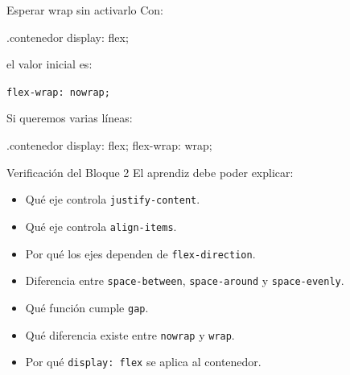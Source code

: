 \documentclass[aspectratio=169,11.5pt]{beamer}
\begin{document}
    \begin{frame}[fragile]{Esperar wrap sin activarlo}
        Con:

        \begin{csscodedark}
            .contenedor {
                display: flex;
            }
        \end{csscodedark}

        el valor inicial es:

        \begin{center}
            \texttt{flex-wrap: nowrap;}
        \end{center}

        Si queremos varias líneas:

        \begin{csscodedark}
            .contenedor {
                display: flex;
                flex-wrap: wrap;
            }
        \end{csscodedark}
    \end{frame}

    \begin{frame}{Verificación del Bloque 2}
        El aprendiz debe poder explicar:

        \begin{itemize}
            \item Qué eje controla \texttt{justify-content}.
            \item Qué eje controla \texttt{align-items}.
            \item Por qué los ejes dependen de \texttt{flex-direction}.
            \item Diferencia entre \texttt{space-between},
            \texttt{space-around} y \texttt{space-evenly}.
            \item Qué función cumple \texttt{gap}.
            \item Qué diferencia existe entre \texttt{nowrap}
            y \texttt{wrap}.
            \item Por qué \texttt{display: flex}
            se aplica al contenedor.
        \end{itemize}
    \end{frame}

\end{document}
